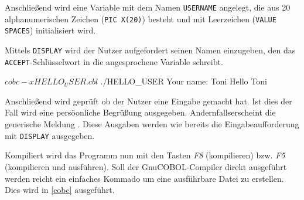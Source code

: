 Anschließend wird eine Variable mit dem Namen \texttt{USERNAME} angelegt, die aus 20 alphanumerischen Zeichen (\texttt{PIC X(20)}) besteht und mit Leerzeichen (\texttt{VALUE SPACES}) initialisiert wird.

Mittels \texttt{DISPLAY} wird der Nutzer aufgefordert seinen Namen einzugeben, den das \texttt{ACCEPT}-Schlüsselwort in die angesprochene Variable schreibt.

\begin{shellwindow}
$ cobc -x HELLO_USER.cbl
$ ./HELLO_USER
Your name: Toni
Hello Toni
\end{shellwindow}

Anschließend wird geprüft ob der Nutzer eine Eingabe gemacht hat. Ist dies der Fall wird eine persöonliche Begrüßung ausgegeben. Andernfallserscheint die generische Meldung . Diese Ausgaben werden wie bereits die Eingabeaufforderung mit \texttt{DISPLAY} ausgegeben.

Kompiliert wird das Programm nun mit den Tasten \textit{F8} (kompilieren) bzw. \textit{F5} (kompilieren und ausführen). Soll der GnuCOBOL-Compiler direkt ausgeführt werden reicht ein einfaches Kommado um eine ausführbare Datei zu erstellen. Dies wird in \autoref{cobc} ausgeführt.